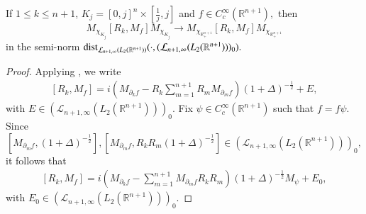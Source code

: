 \documentclass{amsart}
\begin{document}
\begin{lemma}\label{ii verification lemma} If $1\leq k\leq n+1$, $K_j=[0,j]^n\times[\frac1j,j]$ and $f\in C^{\infty}_c(\mathbb{R}^{n+1}),$ then
$$M_{\chi_{K_j}}[R_k,M_f]M_{\chi_{K_j}}\to M_{\chi_{\mathbb{R}^{n+1}_+}}[R_k,M_f]M_{\chi_{\mathbb{R}^{n+1}_+}}$$
in the semi-norm ${\rm dist}_{\mathcal{L}_{n+1,\infty}(L_2(\mathbb{R}^{n+1}))}(\cdot,(\mathcal{L}_{n+1,\infty}(L_2(\mathbb{R}^{n+1})))_0).$
\end{lemma}
\begin{proof} Applying \cite[Theorem 6.3.1]{LSZ2}, we write
\begin{align}\label{equ00}
[R_k,M_f]=i\left(M_{\partial_k f}-R_k\sum_{m=1}^{n+1}R_mM_{\partial_m f}\right)(1+\Delta)^{-\frac12}+E,
\end{align}
with $E\in (\mathcal{L}_{n+1,\infty}(L_2(\mathbb{R}^{n+1})))_0.$ Fix $\psi\in C^{\infty}_c(\mathbb{R}^{n+1})$ such that $f=f\psi.$ Since
$$[M_{\partial_mf},(1+\Delta)^{-\frac12}],[M_{\partial_mf},R_kR_m(1+\Delta)^{-\frac12}]\in (\mathcal{L}_{n+1,\infty}(L_2(\mathbb{R}^{n+1})))_0,$$
it follows that
\begin{align}\label{equ01}
[R_k,M_f]=i\left(M_{\partial_k f}-\sum_{m=1}^{n+1}M_{\partial_m f}R_kR_m\right)(1+\Delta)^{-\frac12}M_{\psi}+E_0,
\end{align}
with $E_0\in (\mathcal{L}_{n+1,\infty}(L_2(\mathbb{R}^{n+1})))_0.$


\end{proof}
\end{document}
